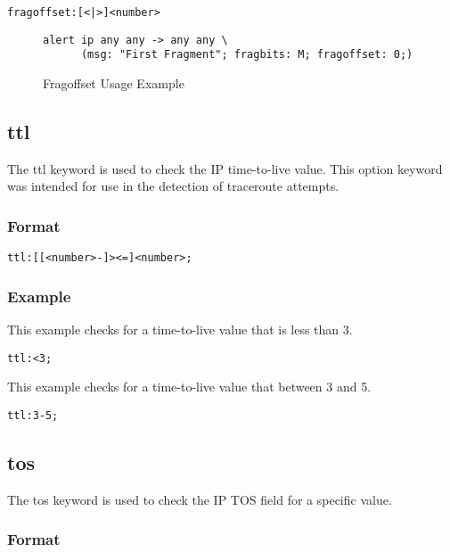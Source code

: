 \documentclass[english]{report}
\begin{document}
\begin{verbatim}
fragoffset:[<|>]<number>
\end{verbatim}

\begin{figure}[!hbpt]
\begin{verbatim}
alert ip any any -> any any \
      (msg: "First Fragment"; fragbits: M; fragoffset: 0;)
\end{verbatim}
\caption{Fragoffset Usage Example \label{fragoffset usage example}}
\end{figure}


\subsection{ttl}

The ttl keyword is used to check the IP time-to-live value.  This option
keyword was intended for use in the detection of traceroute attempts.

\subsubsection{Format}

\begin{verbatim}
ttl:[[<number>-]><=]<number>;
\end{verbatim}

\subsubsection{Example}

This example checks for a time-to-live value that is less than 3.
\begin{verbatim}
ttl:<3;
\end{verbatim}

This example checks for a time-to-live value that between 3 and 5.
\begin{verbatim}
ttl:3-5;
\end{verbatim}

\subsection{tos}

The tos keyword is used to check the IP TOS field for a specific value. 

\subsubsection{Format}
\end{document}
